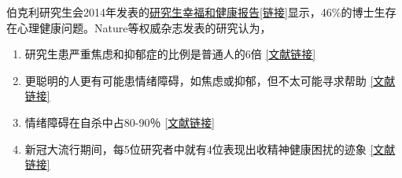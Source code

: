 伯克利研究生会2014年发表的\href{http://ga.berkeley.edu/wellbeingreport}{研究生幸福和健康报告[链接]}显示，46\%的博士生存在心理健康问题。Nature等权威杂志发表的研究认为，
\begin{enumerate}
    \item 研究生患严重焦虑和抑郁症的比例是普通人的6倍 \href{https://www.nature.com/articles/nbt.4089}{[文献链接]}
    \item 更聪明的人更有可能患情绪障碍，如焦虑或抑郁，但不太可能寻求帮助 \href{https://www.nature.com/articles/nj7677-549a}{[文献链接]}
    \item 情绪障碍在自杀中占80-90％ \href{https://www.sciencedirect.com/science/article/pii/S0160289616303324}{[文献链接]}
    \item 新冠大流行期间，每5位研究者中就有4位表现出收精神健康困扰的迹象 \href{https://www.tandfonline.com/doi/full/10.1080/21568235.2021.1992293}{[文献链接]}
\end{enumerate}

